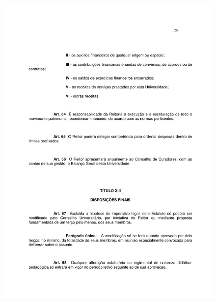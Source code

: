 \begin{figure}[p]
	\centering 
	\includegraphics[scale=0.7]{capitulos/resolucoes/cuni414/cuni414-26.pdf}
\end{figure}

